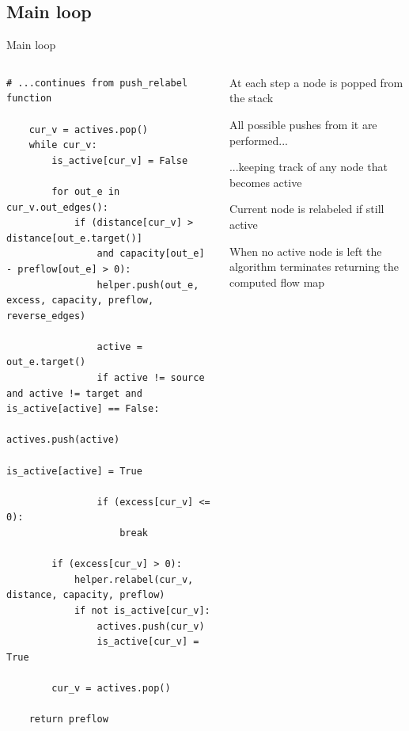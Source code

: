 \documentclass{beamer}
\begin{document}
\subsection{Main loop}
\begin{frame}[fragile]{Main loop}
    \begin{columns}[T]
        \begin{column}{0.50\textwidth}
            \begin{lstlisting}[emph={push,pop,relabel,helper,actives}, emphstyle=\bf]
    # ...continues from push_relabel function

    cur_v = actives.pop()
    while cur_v:
        is_active[cur_v] = False

        for out_e in cur_v.out_edges():
            if (distance[cur_v] > distance[out_e.target()]
                and capacity[out_e] - preflow[out_e] > 0):
                helper.push(out_e, excess, capacity, preflow, reverse_edges)

                active = out_e.target()
                if active != source and active != target and is_active[active] == False:
                    actives.push(active)
                    is_active[active] = True

                if (excess[cur_v] <= 0):
                    break

        if (excess[cur_v] > 0):
            helper.relabel(cur_v, distance, capacity, preflow)
            if not is_active[cur_v]:
                actives.push(cur_v)
                is_active[cur_v] = True

        cur_v = actives.pop()

    return preflow
            \end{lstlisting}
        \end{column}

        \begin{column}{0.70\textwidth}
            \begin{sidecomment}
                \pause
                \vskip 25bp
                At each step a node is popped from the stack

                \pause
                \vskip 10bp
                All possible pushes from it are performed...

                \pause
                \vskip 24bp
                ...keeping track of any node that becomes active

                \pause
                \vskip 43bp
                Current node is relabeled if still active

                \pause
                \vskip 33bp
                When no active node is left the algorithm terminates returning the computed flow map
            \end{sidecomment}
        \end{column}
    \end{columns}
\end{frame}
\end{document}
